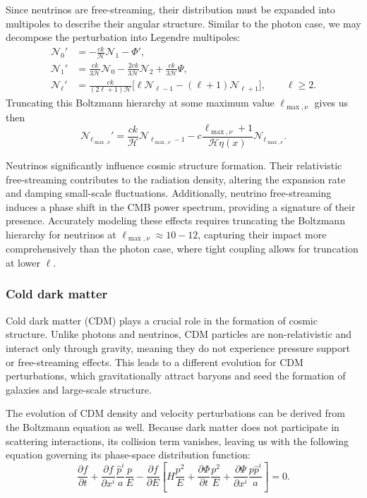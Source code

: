 \documentclass{aa}
\numberwithin{equation}{section}
\numberwithin{table}{section}
\numberwithin{figure}{section}
\begin{document}
Since neutrinos are free-streaming, their distribution must be expanded into multipoles to describe their angular structure. Similar to the photon case, we may decompose the perturbation into Legendre multipoles:
\begin{align}
\mathcal{N}_0' &= -\frac{ck}{\mathcal{H}} \mathcal{N}_1 - \Phi', \\
\mathcal{N}_1' &= \frac{ck}{3\mathcal{H}} \mathcal{N}_0 - \frac{2ck}{3\mathcal{H}} \mathcal{N}_2 + \frac{ck}{3\mathcal{H}} \Psi, \\
\mathcal{N}_\ell' &= \frac{ck}{(2\ell + 1)\mathcal{H}} \Big[\ell\mathcal{N}_{\ell-1} -(\ell+1)\mathcal{N}_{\ell+1}\Big], \qquad \ell \geq 2.
\end{align}
Truncating this Boltzmann hierarchy at some maximum value $\ell_{\max,\nu}$ gives us then
\begin{equation}
  \mathcal{N}_{\ell_{\max,\nu}}' = \frac{ck}{\mathcal{H}} \mathcal{N}_{\ell_{\max,\nu}-1} - c \frac{\ell_{\max,\nu} + 1}{\mathcal{H} \eta(x)} \mathcal{N}_{\ell_{\max,\nu}}.
\end{equation}

Neutrinos significantly influence cosmic structure formation. Their relativistic free-streaming contributes to the radiation density, altering the expansion rate and damping small-scale fluctuations. Additionally, neutrino free-streaming induces a phase shift in the CMB power spectrum, providing a signature of their presence. Accurately modeling these effects requires truncating the Boltzmann hierarchy for neutrinos at $\ell_{\max, \nu} \approx 10-12$, capturing their impact more comprehensively than the photon case, where tight coupling allows for truncation at lower \(\ell\).



\subsubsection{Cold dark matter}
Cold dark matter (CDM) plays a crucial role in the formation of cosmic structure. Unlike photons and neutrinos, CDM particles are non-relativistic and interact only through gravity, meaning they do not experience pressure support or free-streaming effects. This leads to a different evolution for CDM perturbations, which gravitationally attract baryons and seed the formation of galaxies and large-scale structure.

The evolution of CDM density and velocity perturbations can be derived from the Boltzmann equation as well. Because dark matter does not participate in scattering interactions, its collision term vanishes, leaving us with the following equation governing its phase-space distribution function:
\begin{equation}
\frac{\partial f}{\partial t} + \frac{\partial f}{\partial x^i} \frac{\hat{p}^i}{a} \frac{p}{E} - \frac{\partial f}{\partial E} \left[ H \frac{p^2}{E} + \frac{\partial \Phi}{\partial t} \frac{p^2}{E} + \frac{\partial \Psi}{\partial x^i} \frac{p \hat{p}^i}{a} \right] = 0.
\end{equation}
\end{document}
